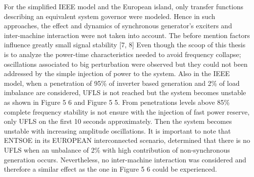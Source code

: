 For the simplified IEEE model and the European island, only transfer functions describing an equivalent system governor were modeled. Hence in such approaches, the effect and dynamics of synchronous generator’s exciters and inter-machine interaction were not taken into account. The before mention factors influence greatly small signal stability [7, 8]
Even though the scoop of this thesis is to analyze the power-time characteristics needed to avoid frequency collapse; oscillations associated to big perturbation were observed but they could not been addressed by the simple injection of power to the system. Also in the IEEE model, when a penetration of 95\% of inverter based generation and 2\% of load imbalance are considered, UFLS is not reached but the system becomes unstable as shown in Figure 5 6 and Figure 5 5. From penetrations levels above 85\% complete frequency stability is not ensure with the injection of fast power reserve, only UFLS on the first 10 seconds approximately. Then the system becomes unstable with increasing amplitude oscillations.
It is important to note that ENTSOE in its EUROPEAN interconnected scenario, determined that there is no UFLS when an unbalance of 2\% with high contribution of non-synchronous generation occurs. Nevertheless, no inter-machine interaction was considered and therefore a similar effect as the one in Figure 5 6 could be experienced.%
